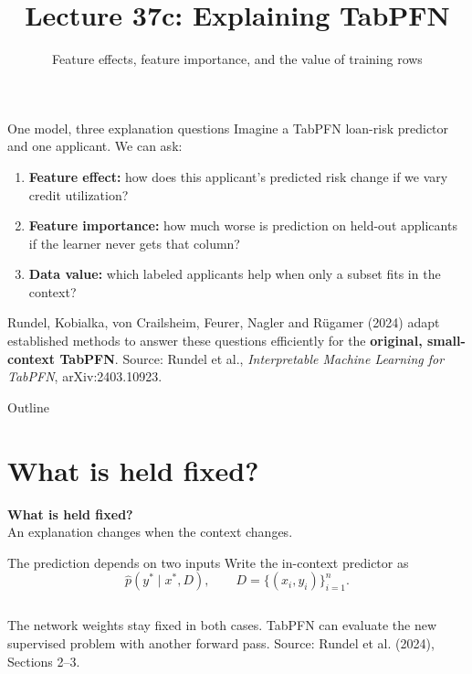 \documentclass[aspectratio=169]{beamer}
\title{Lecture 37c: Explaining TabPFN}
\subtitle{Feature effects, feature importance, and the value of training rows}
\date{}
\begin{document}
\begin{frame}\titlepage\end{frame}

\begin{frame}{One model, three explanation questions}
  \small
  Imagine a TabPFN loan-risk predictor and one applicant. We can ask:
  \vskip 8pt
  \begin{enumerate}\itemsep 7pt
    \item \textbf{Feature effect:} how does this applicant's predicted risk change
      if we vary credit utilization?
    \item \textbf{Feature importance:} how much worse is prediction on held-out
      applicants if the learner never gets that column?
    \item \textbf{Data value:} which labeled applicants help when only a subset
      fits in the context?
  \end{enumerate}
  \vskip 8pt
  Rundel, Kobialka, von Crailsheim, Feurer, Nagler and R\"ugamer (2024)
  adapt established methods to answer these questions efficiently for the
  \textbf{original, small-context TabPFN}.
  \vskip 4pt
  {\scriptsize Source: Rundel et al., \emph{Interpretable Machine Learning for TabPFN}, arXiv:2403.10923.}
\end{frame}

\begin{frame}{Outline}\tableofcontents\end{frame}

\section{What is held fixed?}
\begin{frame}[plain]
  \vfill\centering
  {\Large\color{popblue}\textbf{What is held fixed?}}\\[9pt]
  {\small An explanation changes when the context changes.}
  \vfill
\end{frame}

\begin{frame}{The prediction depends on two inputs}
  \small
  Write the in-context predictor as
  \[\hat p(y^*\mid x^*,D),\qquad D=\{(x_i,y_i)\}_{i=1}^{n}.\]
  \vskip 7pt
  \begin{columns}[T]
  \end{columns}
  \vskip 10pt
  The network weights stay fixed in both cases. TabPFN can evaluate the new
  supervised problem with another forward pass.
  \vskip 4pt
  {\scriptsize Source: Rundel et al. (2024), Sections 2--3.}
\end{frame}
\end{document}
